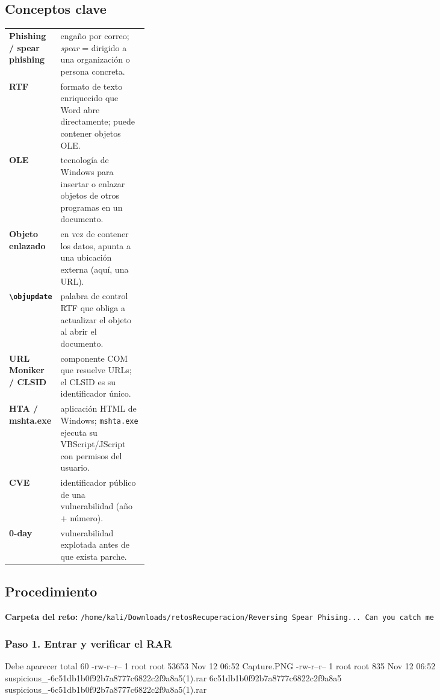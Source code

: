 \documentclass[11pt,a4paper]{article}
\begin{document}
\subsection{Conceptos clave}
\begin{tabularx}{\linewidth}{@{}>{\raggedright\arraybackslash}p{0.27\linewidth}X@{}}
\toprule
\textbf{Phishing / spear phishing} & engaño por correo; \emph{spear} = dirigido a una organización o persona concreta. \\ 
\textbf{RTF} & formato de texto enriquecido que Word abre directamente; puede contener objetos OLE. \\ 
\textbf{OLE} & tecnología de Windows para insertar o enlazar objetos de otros programas en un documento. \\ 
\textbf{Objeto enlazado} & en vez de contener los datos, apunta a una ubicación externa (aquí, una URL). \\ 
\textbf{\texttt{\textbackslash objupdate}} & palabra de control RTF que obliga a actualizar el objeto al abrir el documento. \\ 
\textbf{URL Moniker / CLSID} & componente COM que resuelve URLs; el CLSID es su identificador único. \\ 
\textbf{HTA / mshta.exe} & aplicación HTML de Windows; \texttt{mshta.exe} ejecuta su VBScript/JScript con permisos del usuario. \\ 
\textbf{CVE} & identificador público de una vulnerabilidad (año + número). \\ 
\textbf{0-day} & vulnerabilidad explotada antes de que exista parche. \\ 
\bottomrule
\end{tabularx}

\subsection{Procedimiento}

\noindent\textbf{Carpeta del reto:} \texttt{/\allowbreak{}home/\allowbreak{}kali/\allowbreak{}Downloads/\allowbreak{}retosRecuperacion/\allowbreak{}Reversing Spear Phising... Can you catch me}


\subsubsection*{Paso 1. Entrar y verificar el RAR}
\begin{salida}{Debe aparecer}
total 60
-rw-r--r-- 1 root root 53653 Nov 12 06:52 Capture.PNG
-rw-r--r-- 1 root root   835 Nov 12 06:52 suspicious_-6c51db1b0f92b7a8777c6822c2f9a8a5(1).rar
6c51db1b0f92b7a8777c6822c2f9a8a5  suspicious_-6c51db1b0f92b7a8777c6822c2f9a8a5(1).rar
\end{salida}
\end{document}
